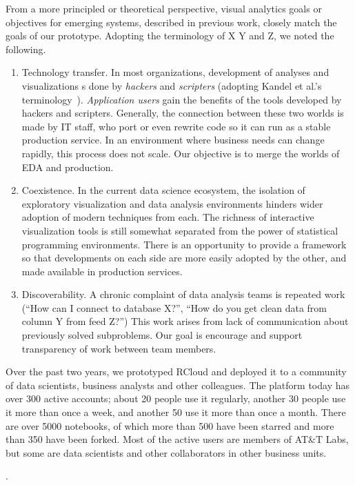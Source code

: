 From a more principled or theoretical perspective, visual analytics goals
or objectives for emerging systems, described in previous work, closely match
the goals of our prototype. Adopting the terminology of X Y and Z, we noted
the following.

\begin{enumerate}

\item Technology transfer.
In most organizations, development of analyses and visualizations 
s done by \emph{hackers} and \emph{scripters} (adopting Kandel et al.'s
terminology~\cite{Kandel:2012:EDA}). \emph{Application users} 
gain the benefits of the tools developed by hackers and scripters.
Generally, the connection between these two worlds is made by IT staff,
who port or even rewrite code so it can run as a stable production service.
In an environment where business needs can change rapidly, this
process does not scale. Our objective is to merge the worlds
of EDA and production.

\item Coexistence. In the current data science ecosystem, the
isolation of exploratory visualization and data analysis
environments hinders wider adoption of modern techniques from each.
The richness of interactive visualization tools is still somewhat
separated from the power of statistical programming environments.
There is an opportunity to provide a framework so that developments
on each side are more easily adopted by the other, and made available
in production services.

\item Discoverability. A chronic complaint of data analysis teams is
repeated work (``How can I connect to database X?'', ``How do you get
clean data from column Y from feed Z?'') This work arises from lack of
communication about previously solved subproblems. Our goal is encourage
and support transparency of work between team members.

\end{enumerate}

Over the past two  years, we prototyped RCloud and deployed it to
a community of data scientists, business analysts and other colleagues.  The
platform today has over 300 active accounts; about 20 people use it regularly,
another 30 people use it more than once a week, and another 50 use it more than
once a month.  There are over 5000 notebooks, of which more than 500 have been
starred and more than 350 have been forked.   Most of the
active users are members of AT\&T Labs, but some are data scientists and other
collaborators in other business units.

.
